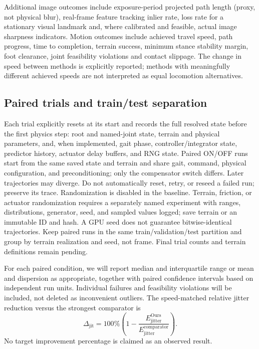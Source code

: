 Additional image outcomes include exposure-period projected path length (proxy, not physical blur), real-frame feature tracking inlier rate, loss rate for a stationary visual landmark and, where calibrated and feasible, actual image sharpness indicators. Motion outcomes include achieved travel speed, path progress, time to completion, terrain success, minimum stance stability margin, foot clearance, joint feasibility violations and contact slippage. The change in speed between methods is explicitly reported; methods with meaningfully different achieved speeds are not interpreted as equal locomotion alternatives.

\subsection{Paired trials and train/test separation}
Each trial explicitly resets at its start and records the full resolved state before the first physics step: root and named-joint state, terrain and physical parameters, and, when implemented, gait phase, controller/integrator state, predictor history, actuator delay buffers, and RNG state. Paired ON/OFF runs start from the same saved state and terrain and share gait, command, physical configuration, and preconditioning; only the compensator switch differs. Later trajectories may diverge. Do not automatically reset, retry, or reseed a failed run; preserve its trace. Randomization is disabled in the baseline. Terrain, friction, or actuator randomization requires a separately named experiment with ranges, distributions, generator, seed, and sampled values logged; save terrain or an immutable ID and hash. A GPU seed does not guarantee bitwise-identical trajectories. Keep paired runs in the same train/validation/test partition and group by terrain realization and seed, not frame. Final trial counts and terrain definitions remain pending.

For each paired condition, we will report median and interquartile range or mean and dispersion as appropriate, together with paired confidence intervals based on independent run units. Individual failures and feasibility violations will be included, not deleted as inconvenient outliers. The speed-matched relative jitter reduction versus the strongest comparator is
\begin{equation}
\Delta_{\mathrm{jit}}=100\%\left(1-\frac{E_{\mathrm{jitter}}^{\mathrm{Ours}}}{E_{\mathrm{jitter}}^{\mathrm{comparator}}}\right).
\end{equation}
No target improvement percentage is claimed as an observed result.

